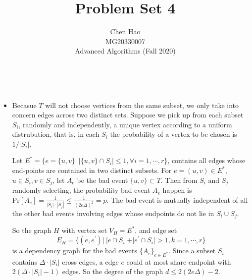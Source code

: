 \documentclass[12pt]{article}
\newenvironment{solution}[2][Solution]{\begin{trivlist}
\item[\hskip \labelsep {\bfseries #1}\hskip \labelsep {\bfseries #2.}]}{\end{trivlist}}
\begin{document}

\title{Problem Set 4}%
\author{Chen Hao \\ MG20330007\\ %
    Advanced Algorithms (Fall 2020)} %

\maketitle

\begin{solution}{1}
    ~

    \begin{itemize}
        \item Becasue $T$ will not choose vertices from the same subset, we only take into concern edges across
        two distinct sets. Suppose we pick up from each subset $S_i$, randomly and independently, a unique vertex
        according to a uniform distrubution, that is, in each $S_i$ the probability of a vertex to be chosen is $1/|S_i|$.

        Let $E^* = \{e = \{u,v\} | ~ |\{u, v\} \cap S_i| \le 1, \forall i = 1, \cdots, r\}$, contains all edges whose end-points
        are contained in two distinct subsets. For $e = (u, v) \in E^*$, $u \in S_i, v \in S_j$, let $A_e$ be the bad event $\{u, v\} \subset T$. Then
        from $S_i$ and $S_j$ randomly selecting, the probability bad event $A_e$ happen is 
        $\mathrm{Pr}[A_e] = \frac{1}{|S_i|\cdot |S_j|} \le \frac{1}{(2e\Delta)^2} = p$. The bad event is mutually independent of all 
        the other bad events involving edges whose endpoints do not lie in $S_i \cup S_j$.

        So the graph $H$ with vertex set $V_H = E^*$, and edge set
        \[E_H = \{(e, e^\prime)|~ |e \cap S_i| + |e^\prime \cap S_i| > 1, k = 1, \cdots, r\}\]
        is a dependency graph for the bad events $\{A_e\}_{e\in E^*}$. Since a subset $S_i$ contains $\Delta\cdot|S_i|$ cross edges, a
        edge $e$ could at most share endpoint with $2(\Delta\cdot|S_i|-1)$ edges. So the degree of the graph $d \le 2(2e\Delta)-2$.


\end{itemize}
\end{solution}
\end{document}
